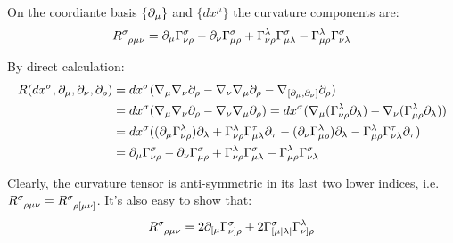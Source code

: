 \begin{proposition}
  On the coordiante basis $ \{\partial_\mu\} $ and $ \{dx^\mu\} $ the curvature components are:
  \begin{equation}
    \tensor{R}{^\sigma _\rho _\mu _\nu} = \pa_\mu \Gamma^\sigma_{\nu \rho} - \pa_\nu \Gamma^\sigma_{\mu \rho} + \Gamma^\lambda_{\nu \rho} \Gamma^\sigma_{\mu \lambda} - \Gamma^\lambda_{\mu \rho} \Gamma^\sigma_{\nu \lambda}
    \label{eq:3.36}
  \end{equation}
\end{proposition}
\begin{proposition}
  By direct calculation:
  \begin{equation*}
    \begin{split}
      R(dx^\sigma, \partial_\mu, \partial_\nu, \partial_\rho)
      &= dx^\sigma (\nabla_\mu \nabla_\nu \partial_\rho - \nabla_\nu \nabla_\mu \partial_\rho - \nabla_{[\partial_\mu, \partial_\nu]} \partial_\rho) \\
      &= dx^\sigma (\nabla_\mu \nabla_\nu \partial_\rho - \nabla_\nu \nabla_\mu \partial_\rho) = dx^\sigma (\nabla_\mu (\Gamma^\lambda_{\nu \rho} \partial_\lambda) - \nabla_\nu (\Gamma^\lambda_{\mu \rho} \partial_\lambda)) \\
      &= dx^\sigma ((\partial_\mu \Gamma^\lambda_{\nu \rho}) \partial_\lambda + \Gamma^\lambda_{\nu \rho} \Gamma^\tau_{\mu \lambda} \partial_\tau - (\partial_\nu \Gamma^\lambda_{\mu \rho}) \partial_\lambda - \Gamma^\lambda_{\mu \rho} \Gamma^\tau_{\nu \lambda} \partial_{\tau}) \\
      &= \partial_\mu \Gamma^\sigma_{\nu \rho} - \partial_\nu \Gamma^\sigma_{\mu \rho} + \Gamma^\lambda_{\nu \rho} \Gamma^\sigma_{\mu \lambda} - \Gamma^\lambda_{\mu \rho} \Gamma^\sigma_{\nu \lambda}
    \end{split}
  \end{equation*}
\end{proposition}

Clearly, the curvature tensor is anti-symmetric in its last two lower indices, i.e. $ \tensor{R}{^\sigma _\rho _\mu _\nu} = \tensor{R}{^\sigma _\rho _[ _\mu _\nu _]} $. It's also easy to show that:
\begin{equation}
  \tensor{R}{^\sigma _\rho _\mu _\nu} = 2 \pa_{[\mu} \Gamma^\sigma_{\nu] \rho} + 2 \Gamma^\sigma_{[\mu | \lambda |} \Gamma^\lambda_{\nu]\rho}
  \label{eq:3.37}
\end{equation}

